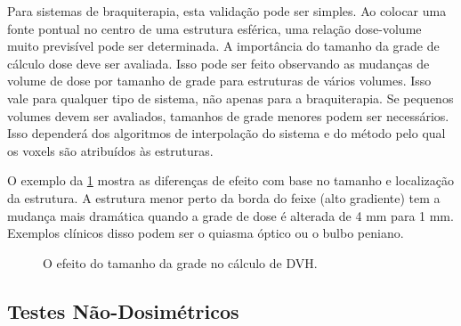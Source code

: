 \documentclass[11pt,a4paper]{article}
\newcounter{exemplo}
\begin{document}
	Para sistemas de braquiterapia, esta validação pode ser simples. Ao colocar uma fonte pontual no centro de uma estrutura esférica, uma relação dose-volume muito previsível pode ser determinada. A importância do tamanho da grade de cálculo dose deve ser avaliada. Isso pode ser feito observando as mudanças de volume de dose por tamanho de grade para estruturas de vários volumes. Isso vale para qualquer tipo de sistema, não apenas para a braquiterapia. Se pequenos volumes devem ser avaliados, tamanhos de grade menores podem ser necessários. Isso dependerá dos algoritmos de interpolação do sistema e do método pelo qual os voxels são atribuídos às estruturas.

	O exemplo da \ref{fig:efeitoDaGradeDeCalculoNoDVH} mostra as diferenças de efeito com base no tamanho e localização da estrutura. A estrutura menor perto da borda do feixe (alto gradiente) tem a mudança mais dramática quando a grade de dose é alterada de 4 mm para 1 mm. Exemplos clínicos disso podem ser o quiasma óptico ou o bulbo peniano.

	\begin{figure}[h]
		\centering
		\caption{O efeito do tamanho da grade no cálculo de DVH.}
		\label{fig:efeitoDaGradeDeCalculoNoDVH}
	\end{figure}

\subsection*{Testes Não-Dosimétricos}
\end{document}
